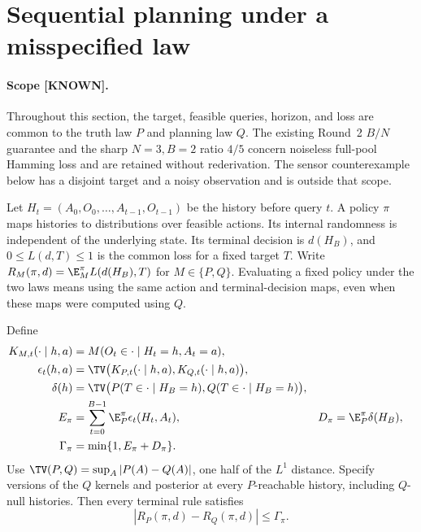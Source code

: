 
\section{Sequential planning under a misspecified law}

\paragraph{Scope [KNOWN].}
Throughout this section, the target, feasible queries, horizon, and loss are
common to the truth law $P$ and planning law $Q$.  The existing Round~2
$B/N$ guarantee and the sharp $N=3,B=2$ ratio $4/5$ concern noiseless
full-pool Hamming loss and are retained without rederivation.  The sensor
counterexample below has a disjoint target and a noisy observation and is
outside that scope.

Let $H_t=(A_0,O_0,\ldots,A_{t-1},O_{t-1})$ be the history before query $t$.
A policy $\pi$ maps histories to distributions over feasible actions.
Its internal randomness is independent of the underlying state.  Its
terminal decision is $d(H_B)$, and $0\leq L(d,T)\leq1$ is the common loss
for a fixed target $T$.  Write $R_M(\pi,d)=\E_M^\pi L(d(H_B),T)$ for
$M\in\{P,Q\}$.  Evaluating a fixed policy under the two laws means using
the same action and terminal-decision maps, even when these maps were
computed using $Q$.

\begin{theorem}
Define
\begin{align*}
 K_{M,t}(\cdot\mid h,a)&=M(O_t\in\cdot\mid H_t=h,A_t=a),\\
 \epsilon_t(h,a)&=\TV\bigl(K_{P,t}(\cdot\mid h,a),
                              K_{Q,t}(\cdot\mid h,a)\bigr),\\
 \delta(h)&=\TV\bigl(P(T\in\cdot\mid H_B=h),
                         Q(T\in\cdot\mid H_B=h)\bigr),\\
 E_\pi&=\sum_{t=0}^{B-1}\E_P^\pi\epsilon_t(H_t,A_t),
 &D_\pi&=\E_P^\pi\delta(H_B),\\
 \Gamma_\pi&=\min\{1,E_\pi+D_\pi\}.
\end{align*}
Use $\TV(P,Q)=\sup_A|P(A)-Q(A)|$, one half of the $L^1$ distance.
Specify versions of the $Q$ kernels and posterior at every $P$-reachable
history, including $Q$-null histories.  Then every terminal rule satisfies
\begin{equation}
 |R_P(\pi,d)-R_Q(\pi,d)|\leq\Gamma_\pi.
 \label{eq:r3-sequential-simulation}
\end{equation}
\end{theorem}

